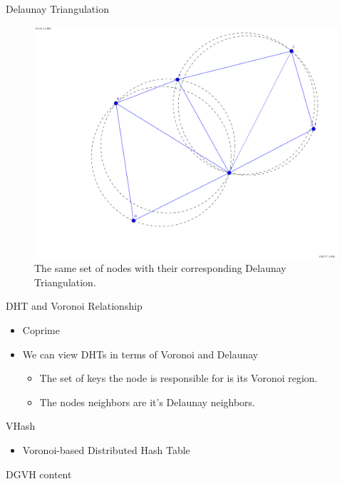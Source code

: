 \documentclass[11pt]{beamer}
\begin{document}

\begin{frame}{Delaunay Triangulation}
	\begin{figure}
		\centering
		\includegraphics[width=0.5\linewidth]{figs/delaunay}
		\caption{The same set of nodes with their corresponding Delaunay Triangulation.}
		\label{fig:delaunay}
	\end{figure}
\end{frame}


\begin{frame}{DHT and Voronoi Relationship }
	\begin{itemize}
		\item Coprime
		\item We can view DHTs in terms of Voronoi and Delaunay
		\begin{itemize}
			\item The set of keys the node is responsible for is its Voronoi region.
			\item The nodes neighbors are it's Delaunay neighbors.
		\end{itemize}
	\end{itemize}
\end{frame}

\begin{frame}{VHash}
	\begin{itemize}
		\item Voronoi-based Distributed Hash Table
	\end{itemize}
\end{frame}


\begin{frame}{DGVH}
	content
\end{frame}
\end{document}
